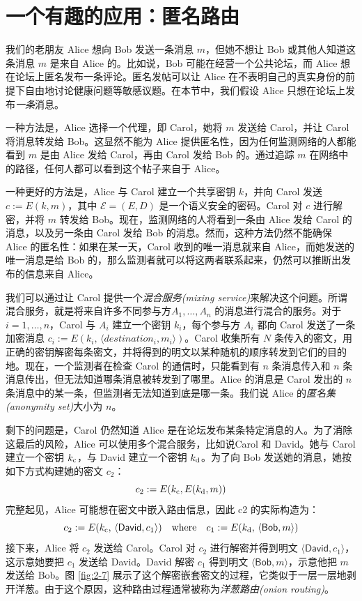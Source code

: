 \section{一个有趣的应用：匿名路由}\label{sec:2-4}

我们的老朋友 Alice 想向 Bob 发送一条消息 $m$，但她不想让 Bob 或其他人知道这条消息 $m$ 是来自 Alice 的。比如说，Bob 可能在经营一个公共论坛，而 Alice 想在论坛上匿名发布一条评论。匿名发帖可以让 Alice 在不表明自己的真实身份的前提下自由地讨论健康问题等敏感议题。在本节中，我们假设 Alice 只想在论坛上发布\emph{一条}消息。

一种方法是，Alice 选择一个代理，即 Carol，她将 $m$ 发送给 Carol，并让 Carol 将消息转发给 Bob。这显然不能为 Alice 提供匿名性，因为任何监测网络的人都能看到 $m$ 是由 Alice 发给 Carol，再由 Carol 发给 Bob 的。通过追踪 $m$ 在网络中的路径，任何人都可以看到这个帖子来自于 Alice。

一种更好的方法是，Alice 与 Carol 建立一个共享密钥 $k$，并向 Carol 发送 $c:=E(k,m)$，其中 $\mathcal{E}=(E,D)$ 是一个语义安全的密码。Carol 对 $c$ 进行解密，并将 $m$ 转发给 Bob。现在，监测网络的人将看到一条由 Alice 发给 Carol 的消息，以及另一条由 Carol 发给 Bob 的消息。然而，这种方法仍然不能确保 Alice 的匿名性：如果在某一天，Carol 收到的唯一消息就来自 Alice，而她发送的唯一消息是给 Bob 的，那么监测者就可以将这两者联系起来，仍然可以推断出发布的信息来自 Alice。

我们可以通过让 Carol 提供一个\emph{混合服务(mixing service)}来解决这个问题。所谓混合服务，就是将来自许多不同参与方$A_1,\dots,A_n$ 的消息进行混合的服务。对于$i=1,\dots,n$，Carol 与 $A_i$ 建立一个密钥 $k_i$，每个参与方 $A_i$ 都向 Carol 发送了一条加密消息 $c_i:=E(k_i,\,\langle destination_i,m_i\rangle)$。Carol 收集所有 $N$ 条传入的密文，用正确的密钥解密每条密文，并将得到的明文以某种随机的顺序转发到它们的目的地。现在，一个监测者在检查 Carol 的通信时，只能看到有 $n$ 条消息传入和 $n$ 条消息传出，但无法知道哪条消息被转发到了哪里。Alice 的消息是 Carol 发出的 $n$ 条消息中的某一条，但监测者无法知道到底是哪一条。我们说 Alice 的\emph{匿名集(anonymity set)}大小为 $n$。

剩下的问题是，Carol 仍然知道 Alice 是在论坛发布某条特定消息的人。为了消除这最后的风险，Alice 可以使用多个混合服务，比如说Carol 和 David。她与 Carol 建立一个密钥 $k_{\rm c}$，与 David 建立一个密钥 $k_{\rm d}$。为了向 Bob 发送她的消息，她按如下方式构建她的密文 $c_2$：
\begin{equation}\label{eq:2-12}
c_2:=E(k_{\rm c},E(k_{\rm d},m))
\end{equation}
完整起见，Alice 可能想在密文中嵌入路由信息，因此 c2 的实际构造为：
\[
c_2:=E(k_{\rm c},\,\langle\mathsf{David},c_1\rangle)\quad\text{where}\quad
c_1:=E(k_{\rm d},\,\langle\mathsf{Bob},m\rangle)
\]
接下来，Alice 将 $c_2$ 发送给 Carol。Carol 对 $c_2$ 进行解密并得到明文 $\langle\mathsf{David},c_1\rangle$，这示意她要把 $c_1$ 发送给 David。David 解密 $c_1$ 得到明文 $\langle\mathsf{Bob},m\rangle$，示意他把 $m$ 发送给 Bob。图 \ref{fig:2-7} 展示了这个解密嵌套密文的过程，它类似于一层一层地剥开洋葱。由于这个原因，这种路由过程通常被称为\emph{洋葱路由(onion routing)}。


